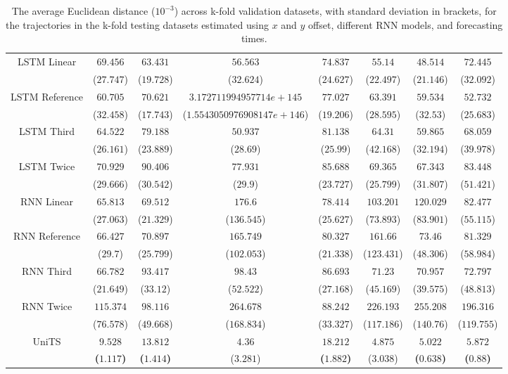 \begin{table}[!ht]
{\begin{tabular}{|c|c|c|c|c|c|c|c|}
			\multirow{2}{*}{LSTM Linear} & $69.456$ & $63.431$ & $56.563$ & $74.837$ & $55.14$ & $48.514$ & $72.445$ \\
			 & ($27.747$) & ($19.728$) & ($32.624$) & ($24.627$) & ($22.497$) & ($21.146$) & ($32.092$) \\ \hline
			\multirow{2}{*}{LSTM Reference} & $60.705$ & $70.621$ & $3.172711994957714e+145$ & $77.027$ & $63.391$ & $59.534$ & $52.732$ \\
			 & ($32.458$) & ($17.743$) & ($1.5543050976908147e+146$) & ($19.206$) & ($28.595$) & ($32.53$) & ($25.683$) \\ \hline
			\multirow{2}{*}{LSTM Third} & $64.522$ & $79.188$ & $50.937$ & $81.138$ & $64.31$ & $59.865$ & $68.059$ \\
			 & ($26.161$) & ($23.889$) & ($28.69$) & ($25.99$) & ($42.168$) & ($32.194$) & ($39.978$) \\ \hline
			\multirow{2}{*}{LSTM Twice} & $70.929$ & $90.406$ & $77.931$ & $85.688$ & $69.365$ & $67.343$ & $83.448$ \\
			 & ($29.666$) & ($30.542$) & ($29.9$) & ($23.727$) & ($25.799$) & ($31.807$) & ($51.421$) \\ \hline
			\multirow{2}{*}{RNN Linear} & $65.813$ & $69.512$ & $176.6$ & $78.414$ & $103.201$ & $120.029$ & $82.477$ \\
			 & ($27.063$) & ($21.329$) & ($136.545$) & ($25.627$) & ($73.893$) & ($83.901$) & ($55.115$) \\ \hline
			\multirow{2}{*}{RNN Reference} & $66.427$ & $70.897$ & $165.749$ & $80.327$ & $161.66$ & $73.46$ & $81.329$ \\
			 & ($29.7$) & ($25.799$) & ($102.053$) & ($21.338$) & ($123.431$) & ($48.306$) & ($58.984$) \\ \hline
			\multirow{2}{*}{RNN Third} & $66.782$ & $93.417$ & $98.43$ & $86.693$ & $71.23$ & $70.957$ & $72.797$ \\
			 & ($21.649$) & ($33.12$) & ($52.522$) & ($27.168$) & ($45.169$) & ($39.575$) & ($48.813$) \\ \hline
			\multirow{2}{*}{RNN Twice} & $115.374$ & $98.116$ & $264.678$ & $88.242$ & $226.193$ & $255.208$ & $196.316$ \\
			 & ($76.578$) & ($49.668$) & ($168.834$) & ($33.327$) & ($117.186$) & ($140.76$) & ($119.755$) \\ \hline
			\multirow{2}{*}{UniTS} & $\mathbf{9.528}$ & $\mathbf{13.812}$ & $4.36$ & $\mathbf{18.212}$ & $4.875$ & $\mathbf{5.022}$ & $\mathbf{5.872}$ \\
			 & \textbf{(}$\mathbf{1.117}$\textbf{)} & \textbf{(}$\mathbf{1.414}$\textbf{)} & ($3.281$) & \textbf{(}$\mathbf{1.882}$\textbf{)} & ($3.038$) & \textbf{(}$\mathbf{0.638}$\textbf{)} & \textbf{(}$\mathbf{0.88}$\textbf{)} \\ \hline
		\end{tabular}
	}
	\caption{The average Euclidean distance ($10^{-3}$) across k-fold validation datasets, with standard deviation in brackets, for the trajectories in the k-fold testing datasets estimated using $x$ and $y$ offset, different RNN models, and forecasting times.}
	\label{tab:all_no_abs_euclid}
\end{table}

